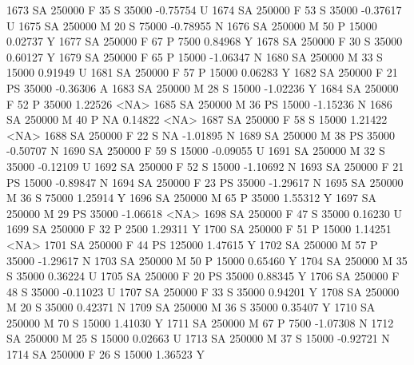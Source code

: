 \documentclass{article}
\begin{document}
\begin{Schunk}
\begin{Soutput}
1673     SA     250000   F  35         S  35000  -0.75754    U
1674     SA     250000   F  53         S  35000  -0.37617    U
1675     SA     250000   M  20         S  75000  -0.78955    N
1676     SA     250000   M  50         P  15000   0.02737    Y
1677     SA     250000   F  67         P   7500   0.84968    Y
1678     SA     250000   F  30         S  35000   0.60127    Y
1679     SA     250000   F  65         P  15000  -1.06347    N
1680     SA     250000   M  33         S  15000   0.91949    U
1681     SA     250000   F  57         P  15000   0.06283    Y
1682     SA     250000   F  21        PS  35000  -0.36306    A
1683     SA     250000   M  28         S  15000  -1.02236    Y
1684     SA     250000   F  52         P  35000   1.22526 <NA>
1685     SA     250000   M  36        PS  15000  -1.15236    N
1686     SA     250000   M  40         P     NA   0.14822 <NA>
1687     SA     250000   F  58         S  15000   1.21422 <NA>
1688     SA     250000   F  22         S     NA  -1.01895    N
1689     SA     250000   M  38        PS  35000  -0.50707    N
1690     SA     250000   F  59         S  15000  -0.09055    U
1691     SA     250000   M  32         S  35000  -0.12109    U
1692     SA     250000   F  52         S  15000  -1.10692    N
1693     SA     250000   F  21        PS  15000  -0.89847    N
1694     SA     250000   F  23        PS  35000  -1.29617    N
1695     SA     250000   M  36         S  75000   1.25914    Y
1696     SA     250000   M  65         P  35000   1.55312    Y
1697     SA     250000   M  29        PS  35000  -1.06618 <NA>
1698     SA     250000   F  47         S  35000   0.16230    U
1699     SA     250000   F  32         P   2500   1.29311    Y
1700     SA     250000   F  51         P  15000   1.14251 <NA>
1701     SA     250000   F  44        PS 125000   1.47615    Y
1702     SA     250000   M  57         P  35000  -1.29617    N
1703     SA     250000   M  50         P  15000   0.65460    Y
1704     SA     250000   M  35         S  35000   0.36224    U
1705     SA     250000   F  20        PS  35000   0.88345    Y
1706     SA     250000   F  48         S  35000  -0.11023    U
1707     SA     250000   F  33         S  35000   0.94201    Y
1708     SA     250000   M  20         S  35000   0.42371    N
1709     SA     250000   M  36         S  35000   0.35407    Y
1710     SA     250000   M  70         S  15000   1.41030    Y
1711     SA     250000   M  67         P   7500  -1.07308    N
1712     SA     250000   M  25         S  15000   0.02663    U
1713     SA     250000   M  37         S  15000  -0.92721    N
1714     SA     250000   F  26         S  15000   1.36523    Y

\end{Soutput}
\end{Schunk}
\end{document}

